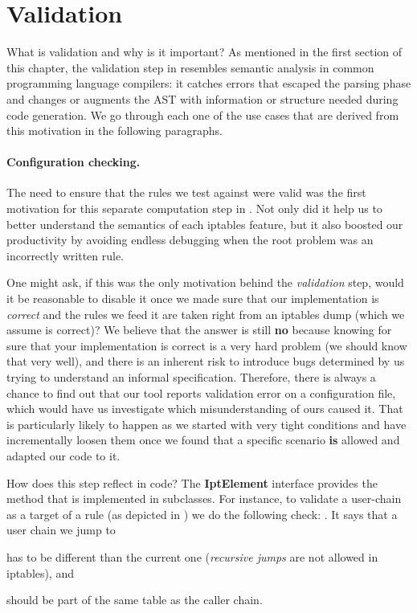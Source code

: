 \section{Validation}

What is validation and why is it important?  As mentioned in the first section
of this chapter, the validation step in \TOOL resembles semantic analysis in
common programming language compilers: it catches errors that escaped the
parsing phase and changes or augments the AST with information or structure
needed during code generation.  We go through each one of the use cases that
are derived from this motivation in the following paragraphs.

\paragraph{Configuration checking.}
The need to ensure that the rules we test against were valid was the first
motivation for this separate computation step in \TOOL.  Not only did it help
us to better understand the semantics of each iptables feature, but it also
boosted our productivity by avoiding endless debugging when the root problem
was an incorrectly written rule.

One might ask, if this was the only motivation behind the \emph{validation}
step, would it be reasonable to disable it once we made sure that our
implementation is \emph{correct} and the rules we feed it are taken right from
an iptables dump (which we assume is correct)?  We believe that the answer is
still \textbf{no} because knowing for sure that your implementation is correct
is a very hard problem (we should know that very well), and there is an
inherent risk to introduce bugs determined by us trying to understand an
informal specification.  Therefore, there is always a chance to find out that
our tool reports validation error on a configuration file, which would have us
investigate which misunderstanding of ours caused it.  That is particularly
likely to happen as we started with very tight conditions and have
incrementally loosen them once we found that a specific scenario \textbf{is}
allowed and adapted our code to it.

How does this step reflect in code?  The \textbf{IptElement} interface provides
the method  that is
implemented in subclasses.  For instance, to validate a user-chain as a target
of a rule (as depicted in ) we do the
following check: .  It
says that a user chain we jump to
\begin{enumerate*}[(i)]
  \item has to be different than the current one (\emph{recursive jumps} are
    not allowed in iptables), and
  \item should be part of the same table as the caller chain.
\end{enumerate*}

